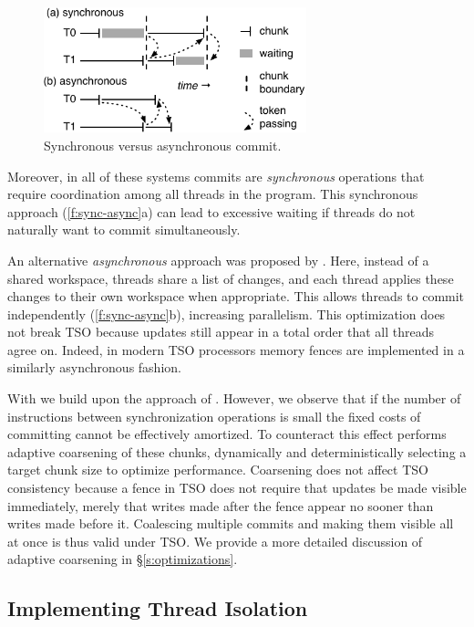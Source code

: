 \begin{figure}
\centering 
\includegraphics[width=3.0in]{figures/sync-async-chunks.pdf}
\caption{Synchronous versus asynchronous commit.}
\label{f:sync-async}
\end{figure}

Moreover, in all of these systems  \cite{bergan_coredet:_2010,derek_r._hower_calvin:_2011,liu_dthreads:_2011} commits are \emph{synchronous} operations that require coordination among all threads in the program. This synchronous approach (\autoref{f:sync-async}a) can lead to excessive waiting if threads do not naturally want to commit simultaneously.

 An alternative \emph{asynchronous} approach was proposed by \cite{merrifield_conversion:_2013}. Here, instead of a shared workspace, threads share a list of changes, and each thread applies these changes to their own workspace when appropriate. This allows threads to commit independently (\autoref{f:sync-async}b), increasing parallelism. This optimization does not break TSO because updates still appear in a total order that all threads agree on. Indeed, in modern TSO processors memory fences are implemented in a similarly asynchronous fashion.

With \lib we build upon the approach of \cite{merrifield_conversion:_2013}. However, we observe that if the number of instructions between synchronization operations is small the fixed costs of committing cannot be effectively amortized. To counteract this effect \lib{} performs adaptive coarsening of these chunks, dynamically and deterministically selecting a target chunk size to optimize performance. Coarsening does not affect TSO consistency because a fence in TSO does not require that updates be made visible immediately, merely that writes made after the fence appear no sooner than writes made before it. Coalescing multiple commits and making them visible all at once is thus valid under TSO. We provide a more detailed discussion of adaptive coarsening in \S\ref{s:optimizations}.

\subsection{Implementing Thread Isolation}
\label{s:isolation}

